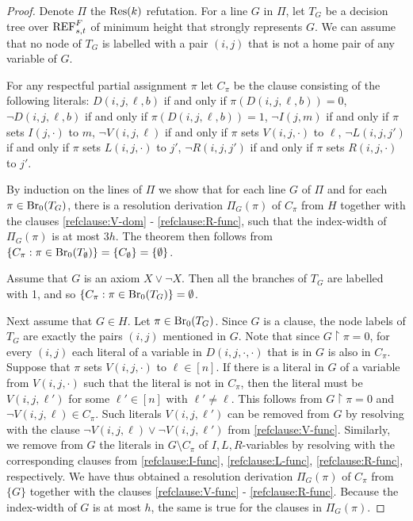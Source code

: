 \documentclass[10pt,a4paper]{article}
\theoremstyle{remark}
\newtheorem*{switching lemma}{Switching Lemma}
\newtheorem*{open problem}{Open Problem}
\theoremstyle{definition}
\begin{document}
\begin{proof}
Denote $\Pi$ the  $\textnormal{Res}(k)$ refutation. For a line $G$ in $\Pi$, let $T_G$ be a decision tree over $\textnormal{REF}^{F}_{s,t}$ of minimum height that strongly represents $G$. We can assume that no node of $T_G$ is labelled with a pair $(i,j)$ that is not a home pair of any variable of $G$.

For any respectful partial assignment $\pi$ let $C_{\pi}$ be the clause consisting of the following literals: $D(i,j,\ell,b)$ if and only if $\pi(D(i,j,\ell,b)) = 0$, $\neg D(i,j,\ell,b)$ if and only if $\pi(D(i,j,\ell,b)) = 1$, $\neg I(j,m)$ if and only if $\pi$ sets $I(j, \cdot)$ to $m$, $\neg V(i,j,\ell)$ if and only if $\pi$ sets $V(i,j,\cdot)$ to $\ell$, $\neg L(i,j,j')$ if and only if $\pi$ sets $L(i,j,\cdot)$ to $j'$, $\neg R(i,j,j')$ if and only if $\pi$ sets $R(i,j,\cdot)$ to $j'$. 

By induction on the lines of $\Pi$ we show that for each line $G$ of $\Pi$ and for each $\pi \in \textnormal{Br}_0(T_G)$, there is a resolution derivation $\Pi_G(\pi)$ of $C_{\pi}$ from $H$ together with the clauses \eqref{refclause:V-dom} - \eqref{refclause:R-func}, such that the index-width of $\Pi_G(\pi)$ is at most $3h$. The theorem then follows from $\{C_{\pi} : \pi \in \textnormal{Br}_0(T_{\emptyset})\} = \{C_{\emptyset}\} = \{\emptyset\}$. 

Assume that $G$ is an axiom $X \lor \neg X$. Then all the branches of $T_G$ are labelled with 1, and so $\{C_{\pi} : \pi \in \textnormal{Br}_0(T_G)\} = \emptyset$.

Next assume that $G \in H$. Let $\pi \in \textnormal{Br}_0(T_G)$. Since $G$ is a clause, the node labels of $T_G$ are exactly the pairs $(i,j)$ mentioned in $G$. Note that since $G \! \restriction \! \pi = 0$, for every $(i,j)$ each literal of a variable in $D(i,j,\cdot, \cdot)$ that is in $G$ is also in $C_{\pi}$. Suppose that $\pi$ sets $V(i,j,\cdot)$ to $\ell \in [n]$. If there is a literal in $G$ of a variable from $V(i,j,\cdot)$ such that the literal is not in $C_{\pi}$, then the literal must be $V(i,j,\ell')$ for some $\ell' \in [n]$ with $\ell' \neq \ell$. This follows from $G \! \restriction \! \pi = 0$ and $\neg V(i,j,\ell) \in C_{\pi}$. Such literals $V(i,j,\ell')$ can be removed from $G$ by resolving with the clause $\neg V(i,j,\ell) \lor \neg V(i,j,\ell')$ from \eqref{refclause:V-func}. Similarly, we remove from $G$ the literals in $G \setminus C_{\pi}$ of $I,L,R$-variables by resolving with the corresponding clauses from \eqref{refclause:I-func}, \eqref{refclause:L-func}, \eqref{refclause:R-func}, respectively. We have thus obtained a resolution derivation $\Pi_G(\pi)$ of $C_{\pi}$ from $\{G\}$ together with the clauses \eqref{refclause:V-func} - \eqref{refclause:R-func}. Because the index-width of $G$ is at most $h$, the same is true for the clauses in $\Pi_G(\pi)$.


\end{proof}
\end{document}
